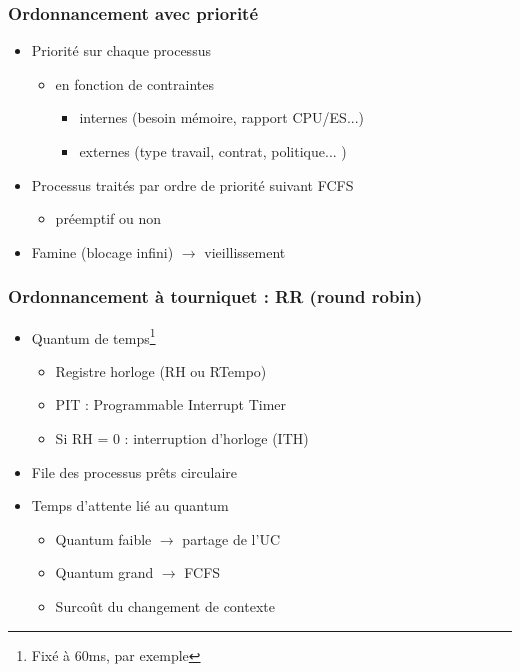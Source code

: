 \begin{frame}
 \frametitle{Ordonnancement avec priorité}
 \begin{itemize}
 \item Priorité sur chaque processus
 \begin{itemize}
 \item en fonction de contraintes
 \begin{itemize}
 \item internes (besoin mémoire, rapport CPU/ES...)
 \item externes (type travail, contrat, politique... )
 \end{itemize} \end{itemize}


 \item Processus traités par ordre de priorité suivant FCFS
 \begin{itemize} \item préemptif ou non  \end{itemize}
 \item Famine (blocage infini) $\rightarrow$ vieillissement
 \end{itemize}
\end{frame}



\begin{frame}
 \frametitle{Ordonnancement à tourniquet : RR (round robin)}
 \begin{itemize}
 \item Quantum de temps\footnote{Fixé à 60ms, par exemple}
 \begin{itemize}
\item Registre horloge (RH ou RTempo)
\item PIT : Programmable Interrupt Timer
\item Si RH = 0 : interruption d'horloge (ITH)
\end{itemize}

 \item File des processus prêts circulaire
 \item Temps d’attente lié au quantum
 \begin{itemize}
 \item Quantum faible $\rightarrow$ partage de l’UC
 \item Quantum grand $\rightarrow$ FCFS
 \item Surcoût du changement de contexte
 \end{itemize}
 \end{itemize}
\end{frame}


